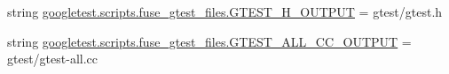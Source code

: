 \begin{DoxyCompactItemize}
\item 
string \mbox{\hyperlink{namespacegoogletest_1_1scripts_1_1fuse__gtest__files_a66e3e78287e366f300e22075da0e3721}{googletest.\+scripts.\+fuse\+\_\+gtest\+\_\+files.\+G\+T\+E\+S\+T\+\_\+\+H\+\_\+\+O\+U\+T\+P\+UT}} = \textquotesingle{}gtest/gtest.\+h\textquotesingle{}
\item 
string \mbox{\hyperlink{namespacegoogletest_1_1scripts_1_1fuse__gtest__files_afc26ec61b35067b9aeac010dd5cc48b9}{googletest.\+scripts.\+fuse\+\_\+gtest\+\_\+files.\+G\+T\+E\+S\+T\+\_\+\+A\+L\+L\+\_\+\+C\+C\+\_\+\+O\+U\+T\+P\+UT}} = \textquotesingle{}gtest/gtest-\/all.\+cc\textquotesingle{}
\end{DoxyCompactItemize}
